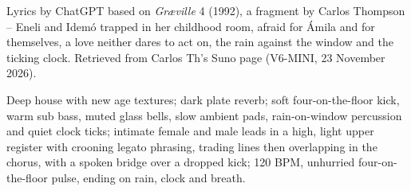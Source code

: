 
\begin{notes}
Lyrics by ChatGPT based on \emph{Gr\ae ville} 4 (1992), a fragment by Carlos Thompson -- Eneli and Idemó trapped in her childhood room, afraid for Ámila and for themselves, a love neither dares to act on, the rain against the window and the ticking clock. Retrieved from Carlos Th's Suno page (V6-MINI, 23 November 2026).
\end{notes}
\begin{style}
Deep house with new age textures; dark plate reverb; soft four-on-the-floor kick, warm sub bass, muted glass bells, slow ambient pads, rain-on-window percussion and quiet clock ticks; intimate female and male leads in a high, light upper register with crooning legato phrasing, trading lines then overlapping in the chorus, with a spoken bridge over a dropped kick; 120 BPM, unhurried four-on-the-floor pulse, ending on rain, clock and breath.
\end{style}
